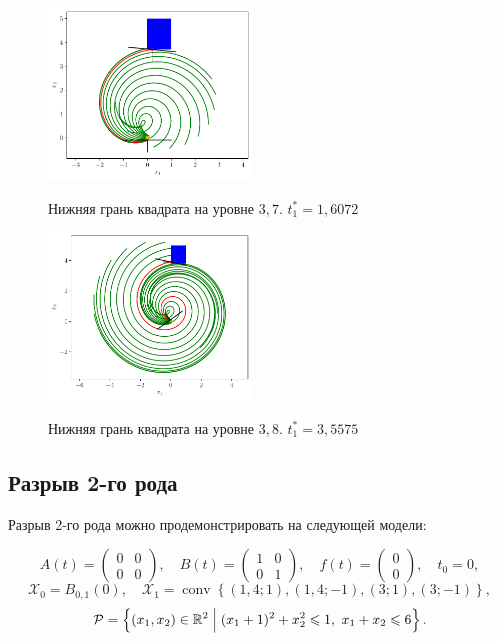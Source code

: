 \documentclass[12pt, a4paper]{article} %
\renewcommand{\le}{\leqslant}
\newcommand{\Real}{\mathbb{R}}
\DeclareMathOperator{\conv}{conv}
\begin{document}
\begin{figure}[H]
    \begin{multicols}{2}
        \begin{centering}
            \includegraphics[width=0.48\textwidth]{figures/ex31_x.pdf}
            \label{fig:ex31_x}
            \caption{Нижняя грань квадрата на уровне $3{,}7$. $t_1^{*} = 1{,}6072$}
            \hfill 
            \includegraphics[width=0.48\textwidth]{figures/ex32_x.pdf}
            \label{fig:ex32_x}
            \caption{Нижняя грань квадрата на уровне $3{,}8$. $t_1^{*} = 3{,}5575$}
        \end{centering} 
    \end{multicols}
\end{figure} 

\subsection{Разрыв 2-го рода}


Разрыв 2-го рода можно продемонстрировать на следующей модели:

\[
    A(t) = 
    \left(\begin{array}{cc}
            0 & 0 \\
            0 & 0
    \end{array}\right), \quad 
    B(t) = \left(
    \begin{array}{cc}
        1 & 0 \\
        0 & 1
    \end{array} \right), \quad 
    f(t) = \left( 
        \begin{array}{cc}
        0 \\ 0
    \end{array} 
    \right), \quad t_0 = 0,
\]
\[
    \mathcal{X}_0 = B_{0{,}1}\left( 0\right), \quad
    \mathcal{X}_1 = \conv \left\{ 
        (1{,}4; 1), (1{,}4; -1), (3; 1), (3; -1)
    \right\}
,\] 
\[
    \mathcal{P} = \left\{ (x_1, x_2) \in \Real^2 \Bigm| 
        (x_1 + 1)^2 + x_2^2 \le 1,\
    x_1 + x_2 \le 6\right\}
.\] 
\end{document}
